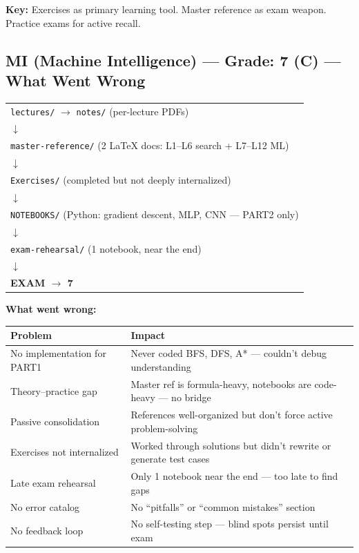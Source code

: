\documentclass[11pt,a4paper]{article}
\begin{document}
\textbf{Key:} Exercises as primary learning tool. Master reference as exam weapon. Practice exams for active recall.

\vspace{0.5em}

\subsection{MI (Machine Intelligence) --- Grade: \textcolor{warnred}{7 (C)} --- What Went Wrong}

\begin{center}
\begin{tabular}{l}
\texttt{lectures/} $\rightarrow$ \texttt{notes/} (per-lecture PDFs) \\
\hspace{3em}$\downarrow$ \\
\texttt{master-reference/} (2 LaTeX docs: L1--L6 search + L7--L12 ML) \\
\hspace{3em}$\downarrow$ \\
\texttt{Exercises/} (completed but not deeply internalized) \\
\hspace{3em}$\downarrow$ \\
\texttt{NOTEBOOKS/} (Python: gradient descent, MLP, CNN --- PART2 only) \\
\hspace{3em}$\downarrow$ \\
\texttt{exam-rehearsal/} (1 notebook, near the end) \\
\hspace{3em}$\downarrow$ \\
\textbf{EXAM $\rightarrow$ 7}
\end{tabular}
\end{center}

\textbf{What went wrong:}

\begin{center}
\renewcommand{\arraystretch}{1.3}
\begin{tabular}{p{4.5cm}p{10cm}}
\toprule
\textbf{Problem} & \textbf{Impact} \\
\midrule
No implementation for PART1 & Never coded BFS, DFS, A* --- couldn't debug understanding \\
Theory--practice gap & Master ref is formula-heavy, notebooks are code-heavy --- no bridge \\
Passive consolidation & References well-organized but don't force active problem-solving \\
Exercises not internalized & Worked through solutions but didn't rewrite or generate test cases \\
Late exam rehearsal & Only 1 notebook near the end --- too late to find gaps \\
No error catalog & No ``pitfalls'' or ``common mistakes'' section \\
No feedback loop & No self-testing step --- blind spots persist until exam \\
\bottomrule
\end{tabular}
\end{center}
\end{document}
